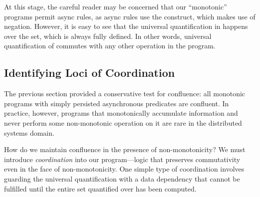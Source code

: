 At this stage, the careful reader may be concerned that our ``monotonic''
programs permit async rules, as async rules use the  construct,
which makes use of negation.  However, it is easy to see that the universal
quantification in  happens over the  set, which
is always fully defined.  In other words, universal quantification of
 commutes with any other operation in the program.


\subsection{Identifying Loci of Coordination}
The previous section provided a conservative test for confluence: all monotonic
programs with simply persisted asynchronous predicates are confluent.  In
practice, however, programs that monotonically accumulate information and never
perform some non-monotonic operation on it are rare in the distributed systems
domain.


How do we maintain confluence in the presence of non-monotonicity?  We must
introduce {\em coordination} into our program---logic that preserves
commutativity even in the face of non-monotonicity.  One simple type of
coordination involves guarding the universal quantification with a data
dependency that cannot be fulfilled until the entire set quantified over has
been computed.

